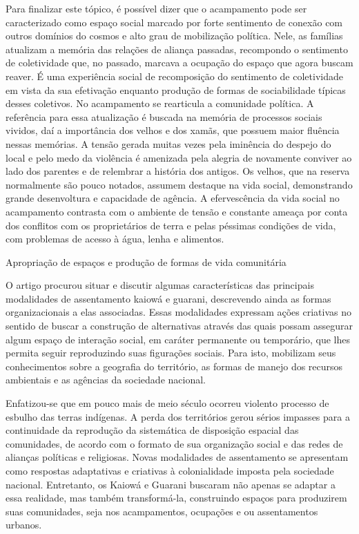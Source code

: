 \documentclass{article}
\begin{document}
Para finalizar este t\'opico, \'e poss\'ivel dizer que o acampamento
pode ser caracterizado como espa\c{c}o social marcado por forte
sentimento de conex\~ao com outros dom\'inios do cosmos e alto grau de
mobiliza\c{c}\~ao pol\'itica. Nele, as fam\'ilias atualizam a mem\'oria
das rela\c{c}\~oes de alian\c{c}a passadas, recompondo o sentimento de
coletividade que, no passado, marcava a ocupa\c{c}\~ao do espa\c{c}o
que agora buscam reaver. \'E uma experi\^encia social de
recomposi\c{c}\~ao do sentimento de coletividade em vista da sua
efetiva\c{c}\~ao enquanto produ\c{c}\~ao de formas de sociabilidade
t\'ipicas desses coletivos. No acampamento se rearticula a comunidade
pol\'itica. A refer\^encia para essa atualiza\c{c}\~ao \'e buscada na
mem\'oria de processos sociais vividos, da\'i a import\^ancia dos
velhos e dos xam\~as, que possuem maior flu\^encia nessas mem\'orias. A
tens\~ao gerada muitas vezes pela imin\^encia do despejo do local e
pelo medo da viol\^encia \'e amenizada pela alegria de novamente
conviver ao lado dos parentes e de relembrar a hist\'oria dos antigos.
Os velhos, que na reserva normalmente s\~ao pouco notados, assumem
destaque na vida social, demonstrando grande desenvoltura e capacidade
de ag\^encia. A efervesc\^encia da vida social no acampamento contrasta
com o ambiente de tens\~ao e constante amea\c{c}a por conta dos
conflitos com os propriet\'arios de terra e pelas p\'essimas
condi\c{c}\~oes de vida, com problemas de acesso \`a \'agua, lenha e
alimentos. 

Apropria\c{c}\~ao de espa\c{c}os e produ\c{c}\~ao de formas de vida
comunit\'aria

O artigo procurou situar e discutir algumas caracter\'isticas das
principais modalidades de assentamento kaiow\'a e guarani, descrevendo
ainda as formas organizacionais a elas associadas. Essas modalidades
expressam a\c{c}\~oes criativas no sentido de buscar a constru\c{c}\~ao
de alternativas atrav\'es das quais possam assegurar algum espa\c{c}o
de intera\c{c}\~ao social, em car\'ater permanente ou tempor\'ario, que
lhes permita seguir reproduzindo suas figura\c{c}\~oes sociais. Para
isto, mobilizam seus conhecimentos sobre a geografia do territ\'orio,
as formas de manejo dos recursos ambientais e as ag\^encias da
sociedade nacional. 

Enfatizou-se que em pouco mais de meio s\'eculo ocorreu violento
processo de esbulho das terras ind\'igenas. A perda dos territ\'orios
gerou s\'erios impasses para a continuidade da reprodu\c{c}\~ao da
sistem\'atica de disposi\c{c}\~ao espacial das comunidades, de acordo
com o formato de sua organiza\c{c}\~ao social e das redes de
alian\c{c}as pol\'iticas e religiosas. Novas modalidades de
assentamento se apresentam como respostas adaptativas e criativas \`a
colonialidade imposta pela sociedade nacional. Entretanto, os Kaiow\'a
e Guarani buscaram n\~ao apenas se adaptar a essa realidade, mas
tamb\'em transform\'a-la, construindo espa\c{c}os para produzirem suas
comunidades, seja nos acampamentos, ocupa\c{c}\~oes e ou assentamentos
urbanos.
\end{document}
